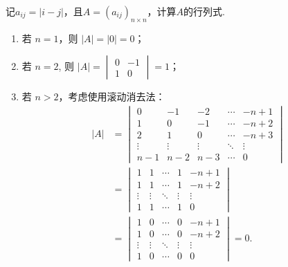 \begin{exercise}
\begin{exgroup}
        \item 记$a_{ij}=|i-j|$，且$A=(a_{ij})_{n\times n}$，计算$A$的行列式.
        \begin{answer}
            \begin{enumerate}
                \item 若 $n=1$，则 $|A| = |0| = 0$；

                \item 若 $n=2$, 则 $|A| = \begin{vmatrix} 0 & -1 \\ 1 & 0 \end{vmatrix} = 1$；

                \item 若 $n>2$，考虑使用滚动消去法：
                    \begin{align*}
                        |A| &= \begin{vmatrix}
                            0      & -1     & -2     & \cdots & -n+1   \\
                            1      & 0      & -1     & \cdots & -n+2   \\
                            2      & 1      & 0      & \cdots & -n+3   \\
                            \vdots & \vdots & \vdots & \ddots & \vdots \\
                            n-1    & n-2    & n-3    & \cdots & 0
                        \end{vmatrix} \\
                        &= \begin{vmatrix}
                            1 & 1 & \cdots & 1 & -n+1 \\
                            1 & 1 & \cdots & 1 & -n+2 \\
                            \vdots & \vdots & \ddots & \vdots & \vdots \\
                            1 & 1 & \cdots & 1 & 0
                        \end{vmatrix} \\
                        &= \begin{vmatrix}
                            1 & 0 & \cdots & 0 & -n+1 \\
                            1 & 0 & \cdots & 0 & -n+2 \\
                            \vdots & \vdots & \ddots & \vdots & \vdots \\
                            1 & 0 & \cdots & 0 & 0
                        \end{vmatrix}
                        = 0.
                    \end{align*}
            \end{enumerate}
        \end{answer}


\end{exgroup}
\end{exercise}
